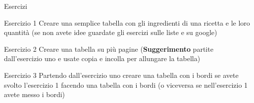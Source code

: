 \begin{frame}[fragile]{Esercizi}

\begin{block}{Esercizio 1}
	Creare una semplice tabella con gli ingredienti di una ricetta e le loro
	quantità (se non avete idee guardate gli esercizi sulle liste e su google)
\end{block}

\begin{block}{Esercizio 2}
	Creare una tabella su più pagine (\textbf{Suggerimento} partite
	dall'esercizio uno e usate copia e incolla per allungare la tabella)
\end{block}

\begin{block}{Esercizio 3}
	Partendo dall'esercizio uno creare una tabella con i bordi se avete svolto
	l'esercizio 1 facendo una tabella con i bordi (o viceversa se
	nell'esercizio 1 avete messo i bordi)
\end{block}

\end{frame}
